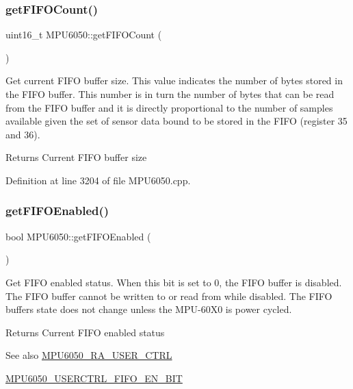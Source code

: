 \subsubsection{\texorpdfstring{getFIFOCount()}{getFIFOCount()}}
{\footnotesize\ttfamily uint16\+\_\+t M\+P\+U6050\+::get\+F\+I\+F\+O\+Count (\begin{DoxyParamCaption}{ }\end{DoxyParamCaption})}

Get current F\+I\+FO buffer size. This value indicates the number of bytes stored in the F\+I\+FO buffer. This number is in turn the number of bytes that can be read from the F\+I\+FO buffer and it is directly proportional to the number of samples available given the set of sensor data bound to be stored in the F\+I\+FO (register 35 and 36). \begin{DoxyReturn}{Returns}
Current F\+I\+FO buffer size 
\end{DoxyReturn}


Definition at line 3204 of file M\+P\+U6050.\+cpp.


\begin{DoxyCode}{0}

\end{DoxyCode}
\mbox{\label{classMPU6050_ae2687a09ebe0d7fbbf74f560e0dd9a44}} 
\subsubsection{\texorpdfstring{getFIFOEnabled()}{getFIFOEnabled()}}
{\footnotesize\ttfamily bool M\+P\+U6050\+::get\+F\+I\+F\+O\+Enabled (\begin{DoxyParamCaption}{ }\end{DoxyParamCaption})}

Get F\+I\+FO enabled status. When this bit is set to 0, the F\+I\+FO buffer is disabled. The F\+I\+FO buffer cannot be written to or read from while disabled. The F\+I\+FO buffer\textquotesingle{}s state does not change unless the M\+P\+U-\/60\+X0 is power cycled. \begin{DoxyReturn}{Returns}
Current F\+I\+FO enabled status 
\end{DoxyReturn}
\begin{DoxySeeAlso}{See also}
\mbox{\hyperlink{MPU6050_8h_acd4c638a6f677a42ecb9a3d7612d087a}{M\+P\+U6050\+\_\+\+R\+A\+\_\+\+U\+S\+E\+R\+\_\+\+C\+T\+RL}} 

\mbox{\hyperlink{MPU6050_8h_a4d287b028bfb7d4f40a8da106ed74d66}{M\+P\+U6050\+\_\+\+U\+S\+E\+R\+C\+T\+R\+L\+\_\+\+F\+I\+F\+O\+\_\+\+E\+N\+\_\+\+B\+IT}} 
\end{DoxySeeAlso}



